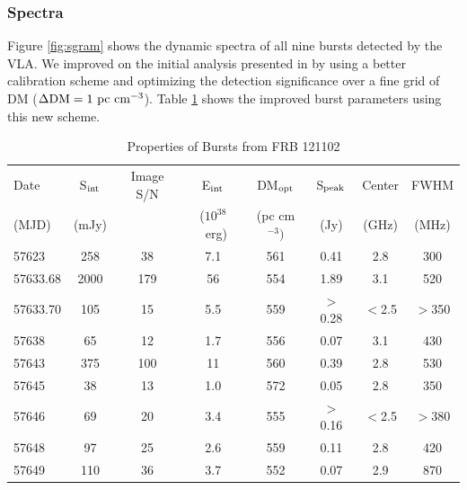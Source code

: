 \documentclass[twocolumn]{aastex61}
\newcommand{\frb}{FRB 121102}
\begin{document}
\subsubsection{Spectra}
\label{sec:spec}
Figure \ref{fig:sgram} shows the dynamic spectra of all nine bursts detected by the VLA. We improved on the initial analysis presented in \citet{LOC} by using a better calibration scheme and optimizing the detection significance over a fine grid of DM ($\Delta \rm{DM}=1\ \rm{pc}\ \rm{cm}^{-3}$). Table \ref{tab:spec} shows the improved burst parameters using this new scheme. 

\begin{table}
\caption{Properties of Bursts from \frb}
\centering
\begin{tabular}{lccccccc}
\hline
Date                & S$_{\rm{int}}$  & Image S/N & E$_{\rm{int}}$ & DM$_{\rm{opt}}$ & S$_{\rm{peak}}$  & Center & FWHM \\
(MJD)               & (mJy)           &           & ($10^{38}$\ erg) & (pc cm$^{-3})$ & (Jy) & (GHz)  & (MHz) \\ \hline
57623               & 258             & 38        & 7.1  & 561 & 0.41                                    & 2.8 & 300 \\
57633.68            & 2000            & 179       & 56   & 554 & 1.89                                    & 3.1 & 520 \\
57633.70\tablenotemark{a} & 105       & 15        & 5.5  & 559 & $>$0.28                                & $<$2.5 & $>$350 \\
57638               & 65              & 12        & 1.7  & 556 & 0.07                                    & 3.1 & 430 \\
57643               & 375             & 100       & 11   & 560 & 0.39                                    & 2.8 & 530 \\
57645               & 38              & 13        & 1.0  & 572 & 0.05                                    & 2.8 & 350 \\
57646\tablenotemark{a} & 69           & 20        & 3.4  & 555 & $>$0.16                                 & $<$2.5 & $>$380 \\
57648\tablenotemark{b} & 97           & 25        & 2.6  & 559 & 0.11                                    & 2.8 & 420 \\
57649               & 110             & 36        & 3.7  & 552 & 0.07                                    & 2.9 & 870 \\ \hline
\end{tabular}
\label{tab:spec}
\end{table} 
\end{document}
